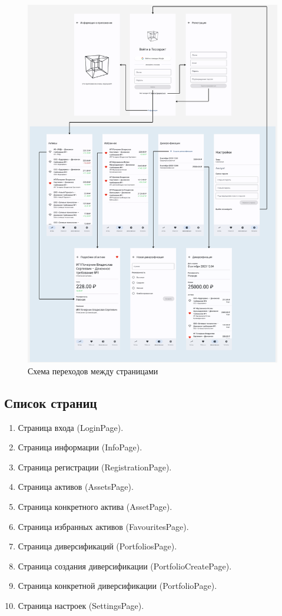 \documentclass[a4paper, 14pt]{article}
\begin{document}
\begin{figure}[H]
    \centering
    \includegraphics[width=17cm]{resources/3.png}
    \caption{Схема переходов между страницами}
\end{figure}

\subsection{Список страниц}

\begin{enumerate}
    \item Страница входа (LoginPage).
    \item Страница информации (InfoPage).
    \item Страница регистрации (RegistrationPage).
    \item Страница активов (AssetsPage).
    \item Страница конкретного актива (AssetPage).
    \item Страница избранных активов (FavouritesPage).
    \item Страница диверсификаций (PortfoliosPage).
    \item Страница создания диверсификации (PortfolioCreatePage).
    \item Страница конкретной диверсификации (PortfolioPage).
    \item Страница настроек (SettingsPage).
\end{enumerate}
\end{document}
